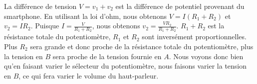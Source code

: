 La différence de tension $V =  v_1 + v_2$ est la différence de potentiel provenant du smartphone. 
En utilisant la loi d'ohm, nous obtenons $V = I (R_1 + R_2)$ et $v_2 = I R_2$. Puisque $I = \frac{V}{R_1+R_2}$, nous obtenons 
$v_2 = \frac{V R_2}{R_1+R_2}$. $R_1+R_2$ est la résistance totale du potentiomètre, $R_1$ et $R_2$ sont inversément proportionnelles. Plus $R_2$ 
sera grande et donc proche de la résistance totale du potentiomètre, plus la tension en $B$ sera proche de la tension fournie en $A$. Nous voyons 
donc bien qu'en faisant varier le sélecteur du potentiomètre, nous faisons varier la tension en $B$, ce qui fera varier le volume du 
haut-parleur.